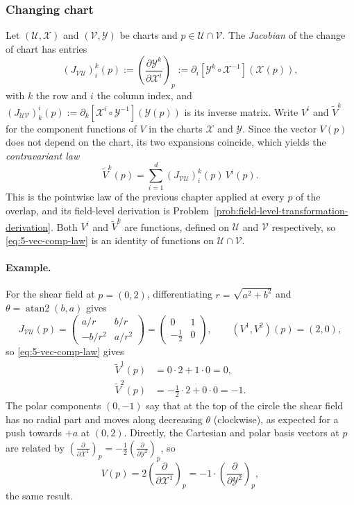 \documentclass[11pt]{article}
\begin{document}
\subsubsection*{Changing chart}
Let $(\mathcal U,\mathcal X)$ and $(\mathcal V,\mathcal Y)$ be charts and $p\in\mathcal U\cap\mathcal V$. The \emph{Jacobian} of the change of chart has entries
\[
(J_{\mathcal{VU}})^k_i(p):=\left(\frac{\partial\mathcal Y^k}{\partial\mathcal X^i}\right)_p:=\partial_i[\mathcal Y^k\circ\mathcal X^{-1}](\mathcal X(p)),
\]
with $k$ the row and $i$ the column index, and $(J_{\mathcal{UV}})^i_k(p):=\partial_k[\mathcal X^i\circ\mathcal Y^{-1}](\mathcal Y(p))$ is its inverse matrix. Write $V^i$ and $\widetilde V^k$ for the component functions of $V$ in the charts $\mathcal X$ and $\mathcal Y$. Since the vector $V(p)$ does not depend on the chart, its two expansions coincide, which yields the \emph{contravariant law}
\begin{equation}
\widetilde V^k(p)=\sum_{i=1}^d(J_{\mathcal{VU}})^k_i(p)\,V^i(p).
\tag{5.2}\label{eq:5-vec-comp-law}
\end{equation}
This is the pointwise law of the previous chapter applied at every $p$ of the overlap, and its field-level derivation is Problem~\ref{prob:field-level-transformation-derivation}. Both $V^i$ and $\widetilde V^k$ are functions, defined on $\mathcal U$ and $\mathcal V$ respectively, so \eqref{eq:5-vec-comp-law} is an identity of functions on $\mathcal U\cap\mathcal V$.

\paragraph{Example.} For the shear field at $p=(0,2)$, differentiating $r=\sqrt{a^2+b^2}$ and $\theta=\operatorname{atan2}(b,a)$ gives
\[
J_{\mathcal{VU}}(p)=\begin{pmatrix}a/r&b/r\\-b/r^2&a/r^2\end{pmatrix}=\begin{pmatrix}0&1\\-\tfrac12&0\end{pmatrix},\qquad (V^1,V^2)(p)=(2,0),
\]
so \eqref{eq:5-vec-comp-law} gives
\begin{align*}
\widetilde V^1(p)&=0\cdot2+1\cdot0=0,\\
\widetilde V^2(p)&=-\tfrac12\cdot2+0\cdot0=-1.
\end{align*}
The polar components $(0,-1)$ say that at the top of the circle the shear field has no radial part and moves along decreasing $\theta$ (clockwise), as expected for a push towards $+a$ at $(0,2)$. Directly, the Cartesian and polar basis vectors at $p$ are related by $\left(\frac{\partial}{\partial\mathcal X^1}\right)_p=-\tfrac12\left(\frac{\partial}{\partial\mathcal Y^2}\right)_p$, so
\[
V(p)=2\left(\frac{\partial}{\partial\mathcal X^1}\right)_p=-1\cdot\left(\frac{\partial}{\partial\mathcal Y^2}\right)_p,
\]
the same result.
\end{document}
